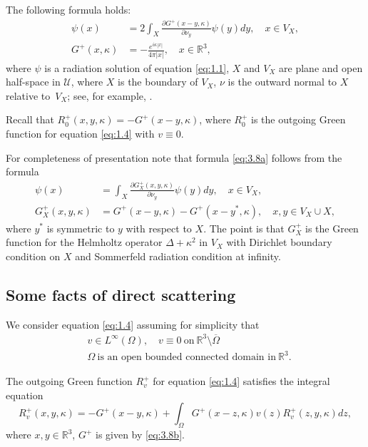 \documentclass[JEP,XML,SOM,Unicode,NoEqCountersInSection,published]{cedram}
\newcommand{\RR}{\mathbb R}
\theoremstyle{definition}
\begin{document}
The following formula holds:
\begin{align}
\psi(x)&= 2\int_{X}\frac{\partial G^+(x-y,\kappa)}{\partial \nu_{y}}\psi(y)dy,\quad x\in V_X, \label{eq:3.8a}\\
G^+(x,\kappa)&= -\frac{e^{i\kappa|x|}}{4\pi|x|},\quad x\in \RR^3, \label{eq:3.8b}
\end{align}
where $\psi$ is a radiation solution of equation \eqref{eq:1.1}, $X$ and $V_X$ are plane and open half-space in $\mathcal{U}$,
where $X$ is the boundary of $V_X$, $\nu$ is the outward normal to $X$ relative to~$V_X$; see, for example, \cite[Eq.\,(5.84)]{BR}.

Recall that $R_0^+(x, y, \kappa)=-G^+(x-y,\kappa)$, where $R_0^+$ is the outgoing Green function for equation \eqref{eq:1.4} with $v \equiv 0$.

For completeness of presentation note that formula \eqref{eq:3.8a} follows from the formula
\begin{equation}\label{eq:3.9a}
\begin{aligned}
\psi(x)&= \int_{X}\frac{\partial G^+_X(x,y,\kappa)}{\partial \nu_{y}}\psi(y)dy,\quad x\in V_X,\\
G^+_X(x,y,\kappa)&= G^+(x-y,\kappa)-G^+(x-y^*,\kappa),\quad x,y\in V_X \cup X,
\end{aligned}
\end{equation}
where $y^*$ is symmetric to $y$ with respect to $X$.
The point is that $G^+_X$ is the Green function for the Helmholtz operator $\Delta+\kappa^2$ in $V_X$
with Dirichlet boundary condition on $X$ and Sommerfeld radiation condition at infinity.

\subsection{Some facts of direct scattering}\label{subsec:3.4}

We consider equation \eqref{eq:1.4} assuming for simplicity that
\begin{equation}\label{eq:3.9}
\begin{aligned}
&v \in L^{\infty}(\Omega),\quad v \equiv 0\ \mbox{on}\ \RR^3\setminus \overline {\Omega}\\
&\Omega\ \mbox{is\ an\ open\ bounded\ connected\ domain\ in}\ \RR^3.
\end{aligned}
\end{equation}

The outgoing Green function $R_v^+$ for equation \eqref{eq:1.4} satisfies the integral equation
\begin{equation}
\label{eq:3.10}
R_v^+(x, y, \kappa)=-G^+(x-y,\kappa) +\int_{\Omega}G^+(x-z,\kappa)v(z)R_v^+(z, y, \kappa)dz,
\end{equation}
where $x,y \in \RR^3$, $G^+$ is given by \eqref{eq:3.8b}.
\end{document}
